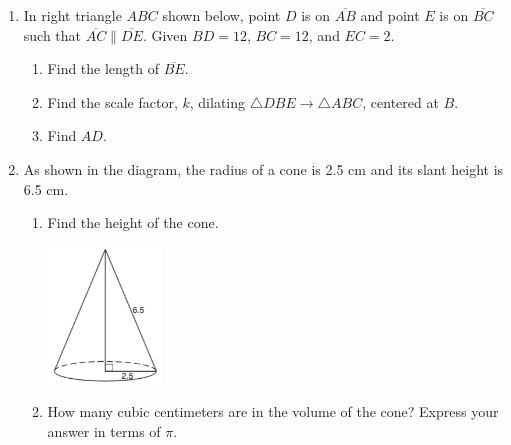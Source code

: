 \documentclass[12pt, twoside]{article}
\begin{document}
\begin{enumerate}
\newpage
\item In right triangle $ABC$ shown below, point $D$ is on $\overline{AB}$ and point $E$ is on $\overline{BC}$ such that $\overline{AC} \parallel \overline{DE}$. Given $BD=12$, $BC=12$, and $EC=2$.
\begin{enumerate}
 \item Find the length of $\overline{BE}$. \vspace{0.5cm}
 \item Find the scale factor, $k$, dilating $\triangle DBE \rightarrow \triangle ABC$, centered at $B$. %
  \begin{flushright}
  \end{flushright}
  \item Find $AD$.
  \end{enumerate} \vspace{2.5cm}

\item As shown in the diagram, the radius of a cone is 2.5 cm and its slant height is 6.5 cm.%
  \begin{enumerate}
    \item Find the height of the cone.
    \begin{flushright}
      \includegraphics[width=0.25\textwidth]{cone_Jan2019-23.png}
    \end{flushright} %
    \item How many cubic centimeters are in the volume of the cone? Express your answer in terms of $\pi$.
  \end{enumerate}

\end{enumerate}
\end{document}
